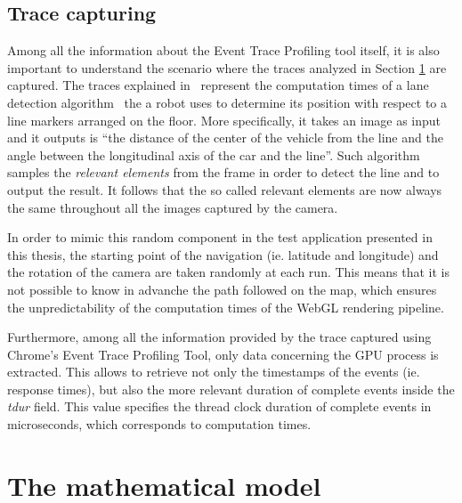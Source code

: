 \subsection{Trace capturing}
Among all the information about the Event Trace Profiling tool itself, it is
also important to understand the scenario where the traces analyzed in Section
\ref{sec:math_model} are captured.
The traces explained in~\cite{frias2017probabilistic} represent the computation
times of a lane detection algorithm~\cite{fontanelli2014vision} the a robot uses
to determine its position with respect to a line markers arranged on the floor.
More specifically, it takes an image as input and it outputs is ``the distance
of the center of the vehicle from the line and the angle between the longitudinal
axis of the car and the line''. Such algorithm samples the \emph{relevant elements}
from the frame in order to detect the line and to output the result. It follows
that the so called relevant elements are now always the same throughout all the
images captured by the camera.

In order to mimic this random component in the test application presented in this
thesis, the starting point of the navigation (ie. latitude and longitude) and
the rotation of the camera are taken randomly at each run.
This means that it is not possible to know in advanche the path followed on the
map, which ensures the unpredictability of the computation times of the WebGL
rendering pipeline.

Furthermore, among all the information provided by the trace captured using
Chrome's Event Trace Profiling Tool, only data concerning the GPU process is
extracted. This allows to retrieve not only the timestamps of the events (ie.
response times), but also the more relevant duration of complete events inside
the \emph{tdur} field. This value specifies the thread clock duration of complete
events in microseconds, which corresponds to computation times.



\section{The mathematical model}\label{sec:math_model}

